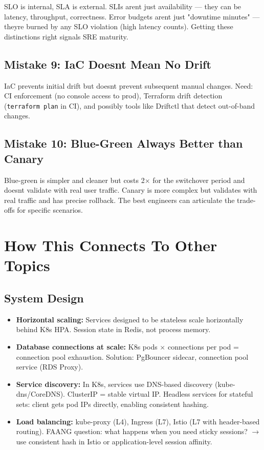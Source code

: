 \documentclass[11pt]{article}
\providecommand{\tightlist}{\setlength{\itemsep}{1pt}\setlength{\parskip}{0pt}}
\begin{document}
SLO is internal, SLA is external. SLIs aren\textquotesingle t just availability --- they can be latency, throughput, correctness. Error budgets aren\textquotesingle t just "downtime minutes" --- they\textquotesingle re burned by any SLO violation (high latency counts). Getting these distinctions right signals SRE maturity.

\subsection{Mistake 9: IaC Doesn\textquotesingle t Mean No Drift}\label{mistake-9-iac-doesnt-mean-no-drift}

IaC prevents initial drift but doesn\textquotesingle t prevent subsequent manual changes. Need: CI enforcement (no console access to prod), Terraform drift detection (\texttt{terraform\ plan} in CI), and possibly tools like Driftctl that detect out-of-band changes.

\subsection{Mistake 10: Blue-Green Always Better than Canary}\label{mistake-10-blue-green-always-better-than-canary}

Blue-green is simpler and cleaner but costs 2\(\times\) for the switchover period and doesn\textquotesingle t validate with real user traffic. Canary is more complex but validates with real traffic and has precise rollback. The best engineers can articulate the trade-offs for specific scenarios.

\section{How This Connects To Other Topics}\label{how-this-connects-to-other-topics}

\subsection{System Design}\label{system-design}

\begin{itemize}
\tightlist
\item
  \textbf{Horizontal scaling:} Services designed to be stateless scale horizontally behind K8s HPA. Session state in Redis, not process memory.
\item
  \textbf{Database connections at scale:} K8s pods \(\times\) connections per pod = connection pool exhaustion. Solution: PgBouncer sidecar, connection pool service (RDS Proxy).
\item
  \textbf{Service discovery:} In K8s, services use DNS-based discovery (kube-dns/CoreDNS). ClusterIP = stable virtual IP. Headless services for stateful sets: client gets pod IPs directly, enabling consistent hashing.
\item
  \textbf{Load balancing:} kube-proxy (L4), Ingress (L7), Istio (L7 with header-based routing). FAANG question: what happens when you need sticky sessions? \(\rightarrow\) use consistent hash in Istio or application-level session affinity.
\end{itemize}
\end{document}
